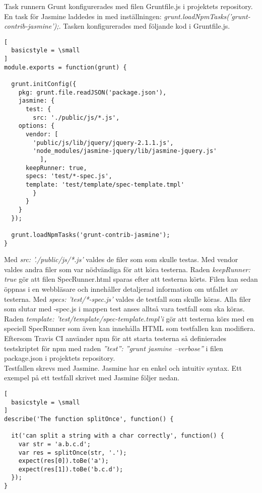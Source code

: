 Task runnern Grunt konfigurerades med filen Gruntfile.js i projektets repository.
En task för Jasmine laddedes in med
inställningen: \emph{grunt.loadNpmTasks('grunt-contrib-jasmine');}.
Tasken konfigurerades med följande kod i Gruntfile.js.

\begin{lstlisting}[
  basicstyle = \small
]
module.exports = function(grunt) {

  grunt.initConfig({
    pkg: grunt.file.readJSON('package.json'),
    jasmine: {
      test: {
        src: './public/js/*.js',
	options: {
	  vendor: [
	    'public/js/lib/jquery/jquery-2.1.1.js',
	    'node_modules/jasmine-jquery/lib/jasmine-jquery.js'
          ],
	  keepRunner: true,
	  specs: 'test/*-spec.js',
	  template: 'test/template/spec-template.tmpl'
        }
      }
    }
  });

  grunt.loadNpmTasks('grunt-contrib-jasmine');
}
\end{lstlisting}

Med \emph{src: './public/js/*.js'} valdes de filer som som skulle testas.
Med vendor valdes andra filer som var nödvändiga för att köra testerna.
Raden \emph{keepRunner: true} gör att filen \textunderscore SpecRunner.html sparas efter att
testerna körts. Filen kan sedan öppnas i en webbläsare och innehåller
detaljerad information om utfallet av testerna.
Med \emph{specs: 'test/*-spec.js'} valdes de testfall som skulle köras.
Alla filer som slutar med -spec.js i mappen test anses alltså vara
testfall som ska köras.
Raden \emph{template: 'test/template/spec-template.tmpl'i} gör att testerna
körs med en speciell SpecRunner som även kan innehålla HTML som testfallen
kan modifiera.
Eftersom Travis CI använder npm för att starta 
testerna så definierades testskriptet för npm med raden
\emph{''test'': ''grunt jasmine --verbose''} i filen package.json 
i projektets repository.\\

Testfallen skrevs med Jasmine. Jasmine har en enkel och intuitiv syntax.
Ett exempel på ett testfall skrivet med Jasmine följer nedan.

\begin{lstlisting}[
  basicstyle = \small
]
describe('The function splitOnce', function() {
	
  it('can split a string with a char correctly', function() {
    var str = 'a.b.c.d';
    var res = splitOnce(str, '.');
    expect(res[0]).toBe('a');
    expect(res[1]).toBe('b.c.d');
  });
}
\end{lstlisting}

